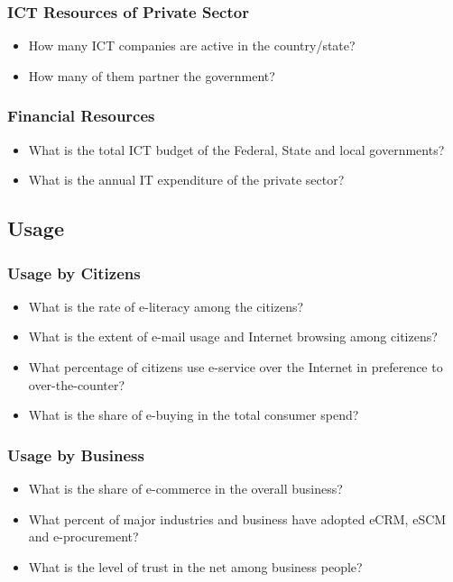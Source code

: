 \subsubsection*{ICT Resources of Private Sector}
\begin{itemize}
	\item How many ICT companies are active in the country/state?
	\item How many of them partner the government?
\end{itemize}

\subsubsection*{Financial Resources}
\begin{itemize}
	\item What is the total ICT budget of the Federal, State and local governments? 
	\item What is the annual IT expenditure of the private sector?
\end{itemize}


\subsection{Usage}
\subsubsection*{Usage by Citizens}
\begin{itemize}
	\item What is the rate of e-literacy among the citizens?

	\item What is the extent of e-mail usage and Internet browsing among citizens?

	\item What percentage of citizens use e-service over the Internet in preference to over-the-counter?

	\item What is the share of e-buying in the total consumer spend?
\end{itemize}

\subsubsection*{Usage by Business}
\begin{itemize}
	\item What is the share of e-commerce in the overall business?

	\item What percent of major industries and business have adopted eCRM, eSCM and e-procurement?

	\item What is the level of trust in the net among business people?
\end{itemize}


